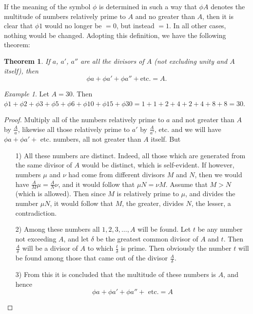 \documentclass{book}
\theoremstyle{plain}
\newtheorem{theorem}{Theorem}
\theoremstyle{remark}
\newtheorem*{example}{Example}
\begin{document}
If the meaning of the symbol $\phi$ is determined in such a way that $\phi A$ denotes the multitude of numbers relatively prime to $A$ and no greater than $A$, then it is clear that $\phi 1$ would no longer be $=0$, but instead $=1$.  In all other cases, nothing would be changed.  Adopting this definition, we have the following theorem:
\begin{theorem} If $a$, $a'$, $a''$ are all the divisors of $A$ (not excluding unity and $A$ itself), then 
\[ \phi a + \phi a' + \phi a'' + \textrm{etc.} = A. \]
\end{theorem}
\begin{example} Let $A = 30$.  Then $\phi 1 + \phi 2 + \phi 3 + \phi 5 + \phi 6 + \phi 10 + \phi 15 + \phi 30 = 1 + 1 + 2 + 4 + 2 + 4 + 8 + 8 = 30$. \end{example}
\begin{proof} Multiply all of the numbers relatively prime to $a$ and not greater than $A$ by $\frac{A}{a}$, likewise all those relatively prime to $a'$ by $\frac{A}{a'}$, etc. and we will have $\phi a + \phi a' + $ etc. numbers, all not greater than $A$ itself.  But 
\begin{itemize}
\item[1)] All these numbers are distinct.  Indeed, all those which are generated from the same divisor of $A$ would be distinct, which is self-evident.   If however, numbers $\mu$ and $\nu$ had come from different divisors $M$ and $N$, then we would have $\frac{A}{M} \mu = \frac{A}{N} \nu$, and it would follow that $\mu N = \nu M$.  Assume that $M>N$ (which is allowed).  Then since $M$ is relatively prime to $\mu$, and divides the number $\mu N$, it would follow that $M$, the greater, divides $N$, the lesser, a contradiction.
\item[2)] Among these numbers all $1, 2, 3, \dots, A$ will be found.  Let $t$ be any number not exceeding $A$, and let $\delta$ be the greatest common divisor of $A$ and $t$.  Then $\frac{A}{\delta}$ will be a divisor of $A$ to which $\frac{t}{\delta}$ is prime. Then obviously the number $t$ will be found among those that came out of the divisor $\frac{A}{\delta}$.
\item[3)] From this it is concluded that the multitude of these numbers is $A$, and hence
\[ \phi a + \phi a' + \phi a'' + \textrm{ etc.} = A \]
\end{itemize} \end{proof}
\end{document}
